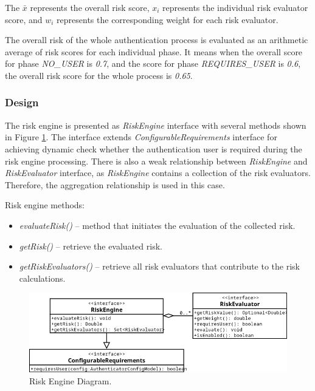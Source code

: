 The \( \bar{x} \) represents the overall risk score, \( x_i \) represents the individual risk evaluator score, and \( w_i \) represents the corresponding weight for each risk evaluator.

The overall risk of the whole authentication process is evaluated as an arithmetic average of risk scores for each individual phase.
It means when the overall score for phase \textit{NO\_USER} is \textit{0.7}, and the score for phase \textit{REQUIRES\_USER} is \textit{0.6}, the overall risk score for the whole process is \textit{0.65}. 

\subsubsection{Design}
The risk engine is presented as \textit{RiskEngine} interface with several methods shown in Figure \ref{fig:design-user-engine-diagram}.
The interface extends \textit{ConfigurableRequirements} interface for achieving dynamic check whether the authentication user is required during the risk engine processing.
There is also a weak relationship between \textit{RiskEngine} and \textit{RiskEvaluator} interface, as \textit{RiskEngine} contains a collection of the risk evaluators.
Therefore, the aggregation relationship is used in this case. 

\newpage

Risk engine methods:

\begin{itemize}
    \item \textit{evaluateRisk()} -- method that initiates the evaluation of the collected risk.
    \item \textit{getRisk()} -- retrieve the evaluated risk.
    \item \textit{getRiskEvaluators()} -- retrieve all risk evaluators that contribute to the risk calculations.
\end{itemize}

\begin{figure}[htbp]
  \centering
  \includegraphics[width=1\textwidth]{img/sections/5-design/risk-engine.png}
  \caption{Risk Engine Diagram.}
  \label{fig:design-user-engine-diagram}
\end{figure}

